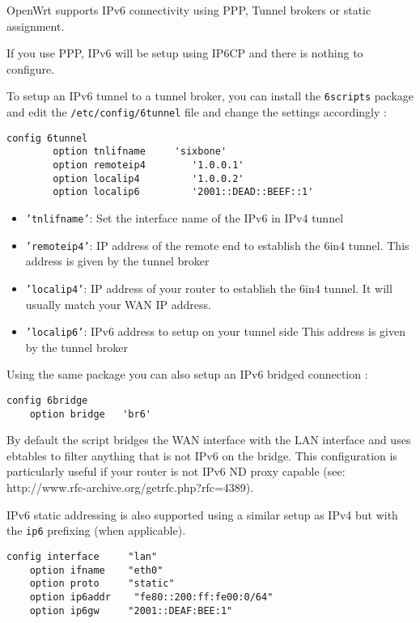 OpenWrt supports IPv6 connectivity using PPP, Tunnel brokers or static
assignment.

If you use PPP, IPv6 will be setup using IP6CP and there is nothing to
configure.

To setup an IPv6 tunnel to a tunnel broker, you can install the
\texttt{6scripts} package and edit the \texttt{/etc/config/6tunnel}
file and change the settings accordingly :

\begin{Verbatim}
config 6tunnel
        option tnlifname     'sixbone'
        option remoteip4        '1.0.0.1'
        option localip4         '1.0.0.2'
        option localip6         '2001::DEAD::BEEF::1'
\end{Verbatim}

\begin{itemize}
    \item{\texttt{'tnlifname'}:}
        Set the interface name of the IPv6 in IPv4 tunnel
    \item{\texttt{'remoteip4'}:}
        IP address of the remote end to establish the 6in4 tunnel.
	This address is given by the tunnel broker
    \item{\texttt{'localip4'}:}
	IP address of your router to establish the 6in4 tunnel.
	It will usually match your WAN IP address.
    \item{\texttt{'localip6'}:}
	IPv6 address to setup on your tunnel side
	This address is given by the tunnel broker
\end{itemize}

Using the same package you can also setup an IPv6 bridged connection :

\begin{Verbatim}
config 6bridge
	option bridge	'br6'
\end{Verbatim}

By default the script bridges the WAN interface with the LAN interface
and uses ebtables to filter anything that is not IPv6 on the bridge.
This configuration is particularly useful if your router is not
IPv6 ND proxy capable (see: http://www.rfc-archive.org/getrfc.php?rfc=4389).


IPv6 static addressing is also supported using a similar setup as
IPv4 but with the \texttt{ip6} prefixing (when applicable).

\begin{Verbatim}
config interface     "lan"
    option ifname    "eth0"
    option proto     "static"
    option ip6addr    "fe80::200:ff:fe00:0/64"
    option ip6gw     "2001::DEAF:BEE:1"
\end{Verbatim}
